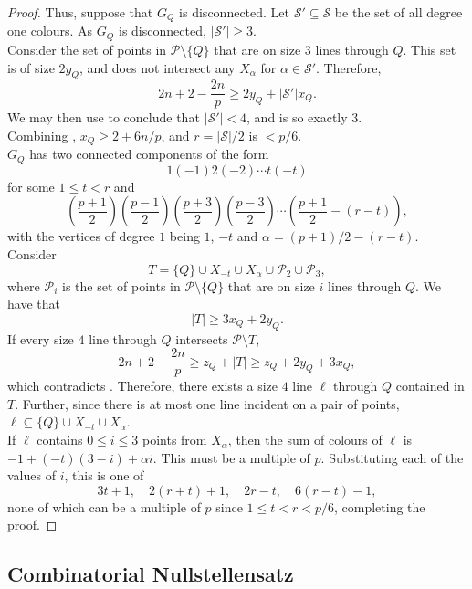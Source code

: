 \begin{proof}
		Thus, suppose that $G_Q$ is disconnected. Let $\mathcal{S}' \subseteq \mathcal{S}$ be the set of all degree one colours. As $G_Q$ is disconnected, $|\mathcal{S}'| \ge 3$.\\
		Consider the set of points in $\mathcal{P} \setminus \{Q\}$ that are on size $3$ lines through $Q$. This set is of size $2y_Q$, and does not intersect any $X_\alpha$ for $\alpha \in \mathcal{S}'$. Therefore,
		\begin{equation}
			\label{eqn: xQ yQ joint bound 2}
			2n + 2 - \frac{2n}{p} \ge 2 y_Q + |\mathcal{S}'| x_Q.
		\end{equation}
		We may then use  to conclude that $|\mathcal{S}'| < 4$, and is so exactly $3$.\\
		Combining , $x_Q \ge 2 + 6n/p$, and $r = |\mathcal{S}|/2$ is $< p/6$.\\
		$G_Q$ has two connected components of the form
		\[ 1 (-1) 2 (-2) \cdots t (-t) \]
		for some $1 \le t < r$ and
		\[ \left( \frac{p+1}{2} \right) \left( \frac{p-1}{2} \right) \left( \frac{p+3}{2} \right) \left( \frac{p-3}{2} \right) \cdots \left( \frac{p+1}{2} - (r-t) \right), \]
		with the vertices of degree $1$ being $1$, $-t$ and $\alpha = (p+1)/2 - (r-t)$. Consider
		\[ T = \{Q\} \cup X_{-t} \cup X_\alpha \cup \mathcal{P}_2 \cup \mathcal{P}_3, \]
		where $\mathcal{P}_i$ is the set of points in $\mathcal{P} \setminus \{Q\}$ that are on size $i$ lines through $Q$. We have that
		\[ |T| \ge 3x_Q + 2y_Q. \]
		If every size $4$ line through $Q$ intersects $\mathcal{P} \setminus T$,
		\[ 2n + 2 - \frac{2n}{p} \ge z_Q + |T| \ge z_Q + 2y_Q + 3x_Q, \]
		which contradicts . Therefore, there exists a size $4$ line $\ell$ through $Q$ contained in $T$. Further, since there is at most one line incident on a pair of points, $\ell \subseteq \{Q\} \cup X_{-t} \cup X_\alpha$.\\
		If $\ell$ contains $0 \le i \le 3$ points from $X_\alpha$, then the sum of colours of $\ell$ is $-1 + (-t)(3-i) + \alpha i$. This must be a multiple of $p$. Substituting each of the values of $i$, this is one of
		\[ 3t+1,\quad 2(r+t)+1,\quad 2r-t,\quad 6(r-t)-1, \]
		none of which can be a multiple of $p$ since $1 \le t < r < p/6$, completing the proof.
	\end{proof}

\subsection{Combinatorial Nullstellensatz}

